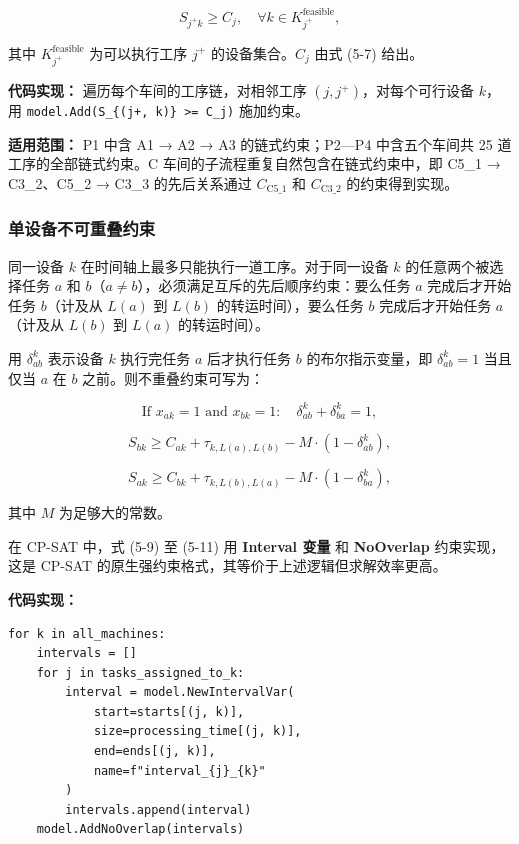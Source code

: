 \documentclass[UTF8,a4paper,12pt]{ctexart}
\begin{document}
\begin{equation}
S_{j^+k} \geq C_j, \quad \forall k \in K_{j^+}^{\text{feasible}},
\end{equation}

其中 $K_{j^+}^{\text{feasible}}$ 为可以执行工序 $j^+$ 的设备集合。$C_j$ 由式 (5-7) 给出。

\textbf{代码实现：} 遍历每个车间的工序链，对相邻工序 $(j, j^+)$，对每个可行设备 $k$，用 \texttt{model.Add(S\_\{(j+, k)\} >= C\_j)} 施加约束。

\textbf{适用范围：} P1 中含 A1 → A2 → A3 的链式约束；P2—P4 中含五个车间共 25 道工序的全部链式约束。C 车间的子流程重复自然包含在链式约束中，即 C5\_1 → C3\_2、C5\_2 → C3\_3 的先后关系通过 $C_{\text{C5\_1}}$ 和 $C_{\text{C3\_2}}$ 的约束得到实现。

\subsubsection{单设备不可重叠约束}
同一设备 $k$ 在时间轴上最多只能执行一道工序。对于同一设备 $k$ 的任意两个被选择任务 $a$ 和 $b$（$a \neq b$），必须满足互斥的先后顺序约束：要么任务 $a$ 完成后才开始任务 $b$（计及从 $L(a)$ 到 $L(b)$ 的转运时间），要么任务 $b$ 完成后才开始任务 $a$（计及从 $L(b)$ 到 $L(a)$ 的转运时间）。

用 $\delta_{ab}^k$ 表示设备 $k$ 执行完任务 $a$ 后才执行任务 $b$ 的布尔指示变量，即 $\delta_{ab}^k = 1$ 当且仅当 $a$ 在 $b$ 之前。则不重叠约束可写为：

\begin{equation}
\text{If } x_{ak} = 1 \text{ and } x_{bk} = 1: \quad \delta_{ab}^k + \delta_{ba}^k = 1,
\end{equation}

\begin{equation}
S_{bk} \geq C_{ak} + \tau_{k, L(a), L(b)} - M \cdot (1 - \delta_{ab}^k),
\end{equation}

\begin{equation}
S_{ak} \geq C_{bk} + \tau_{k, L(b), L(a)} - M \cdot (1 - \delta_{ba}^k),
\end{equation}

其中 $M$ 为足够大的常数。

在 CP-SAT 中，式 (5-9) 至 (5-11) 用 \textbf{Interval 变量} 和 \textbf{NoOverlap} 约束实现，这是 CP-SAT 的原生强约束格式，其等价于上述逻辑但求解效率更高。

\textbf{代码实现：}
\begin{verbatim}
for k in all_machines:
    intervals = []
    for j in tasks_assigned_to_k:
        interval = model.NewIntervalVar(
            start=starts[(j, k)],
            size=processing_time[(j, k)],
            end=ends[(j, k)],
            name=f"interval_{j}_{k}"
        )
        intervals.append(interval)
    model.AddNoOverlap(intervals)
\end{verbatim}
\end{document}
